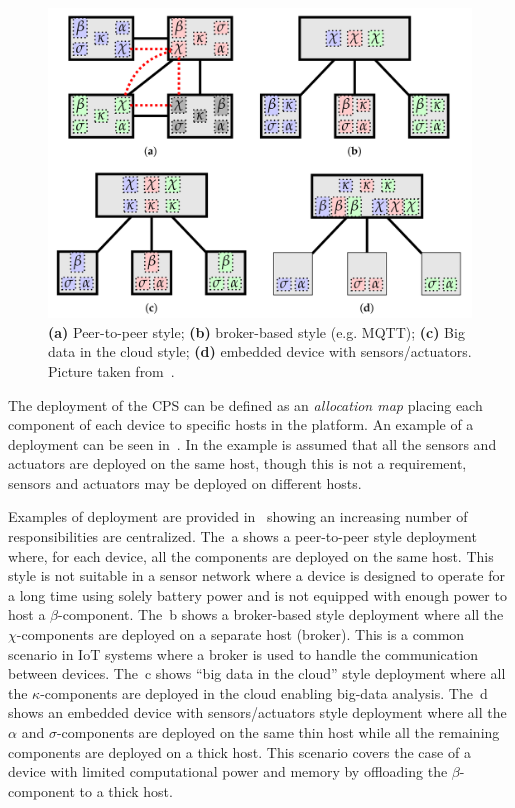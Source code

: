 \begin{figure}[ht]
	\centering
	\includegraphics[width=0.7\linewidth]{figures/notable-deployments.png}
	\caption[Styles of pulverization deployment]{\textbf{(a)} Peer-to-peer style; \textbf{(b)} broker-based style (e.g. MQTT); \textbf{(c)} Big data in the cloud style; \textbf{(d)} embedded device with sensors/actuators. Picture taken from~\cite{fi12110203}.}
	\label{fig:notable-deployments}
\end{figure}

The deployment of the CPS can be defined as an \emph{allocation map} placing each component of each device to specific hosts in the platform.
An example of a deployment can be seen in~. In the example is assumed that all the sensors and actuators are deployed on the
same host, though this is not a requirement, sensors and actuators may be deployed on different hosts.

Examples of deployment are provided in~ showing an increasing number of responsibilities are centralized.
The~a shows a peer-to-peer style deployment where, for each device, all the components are deployed on the same host.
This style is not suitable in a sensor network where a device is designed to operate for a long time using solely battery power and is not equipped
with enough power to host a $\beta$-component.
The~b shows a broker-based style deployment where all the $\chi$-components are deployed on a separate host (broker).
This is a common scenario in IoT systems where a broker is used to handle the communication between devices.
The~c shows ``big data in the cloud'' style deployment where all the $\kappa$-components are deployed in the cloud
enabling big-data analysis.
The~d shows an embedded device with sensors/actuators style deployment where all the $\alpha$ and $\sigma$-components
are deployed on the same thin host while all the remaining components are deployed on a thick host. This scenario covers the case of a device
with limited computational power and memory by offloading the $\beta$-component to a thick host.

